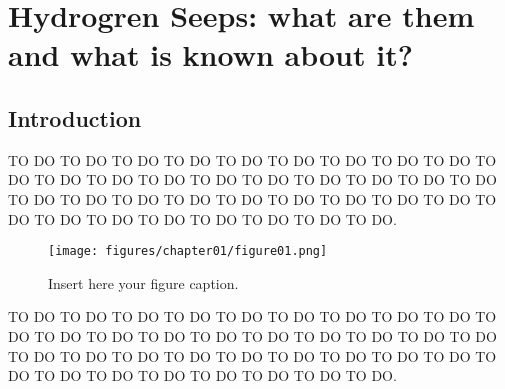 \hypertarget{knowledge-about-hydrogen-seeps}{%
\chapter{Hydrogren Seeps: what are them and what is known about it?}\label{cloudsen12---a-global-benchmark-dataset-for-cloud-semantic-understanding}}


\hypertarget{introduction}{%
\section{Introduction}\label{introduction}}

TO DO TO DO TO DO TO DO TO DO TO DO TO DO TO DO TO DO TO DO TO DO TO DO TO DO TO DO TO DO TO DO TO DO TO DO TO DO TO DO TO DO TO DO TO DO TO DO TO DO TO DO TO DO TO DO TO DO TO DO TO DO TO DO TO DO TO DO TO DO TO DO.
\begin{figure}[!h]
    \centering
    \texttt{[image: figures/chapter01/figure01.png]}
    \caption{Insert here your figure caption.}
    \label{fig:figure01}
\end{figure}

TO DO TO DO TO DO TO DO TO DO TO DO TO DO TO DO TO DO TO DO TO DO TO DO TO DO TO DO TO DO TO DO TO DO TO DO TO DO TO DO TO DO TO DO TO DO TO DO TO DO TO DO TO DO TO DO TO DO TO DO TO DO TO DO TO DO TO DO TO DO TO DO.


